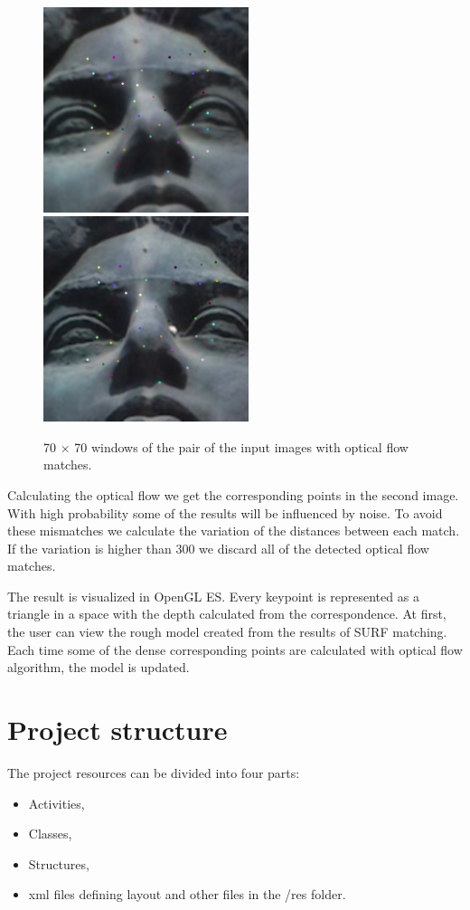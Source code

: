 \begin{figure}[h]
\centerline{
\includegraphics[width=6.0cm]{img/trackingpoints1a.png}
\includegraphics[width=6.0cm]{img/trackingpoints2a.png}}
\caption{70 $\times$ 70 windows of the pair of the input images with optical flow matches.}
\label{fig:trackingpoints}
\end{figure}

Calculating the optical flow we get the corresponding points in the second image.
With high probability some of the results will be influenced by noise.
To avoid these mismatches we calculate the variation of the distances between each match.
If the variation is higher than 300 we discard all of the detected optical flow matches.

The result is visualized in OpenGL ES.
Every keypoint is represented as a triangle in a space with the depth calculated from the correspondence.
At first, the user can view the rough model created from the results of SURF matching.
Each time some of the dense corresponding points are calculated with optical flow algorithm, the model is updated.

\section{Project structure}
The project resources can be divided into four parts:
\begin{itemize}
\item{Activities, }
\item{Classes, }
\item{Structures, }
\item{xml files defining layout and other files in the /res folder.}
\end{itemize}


